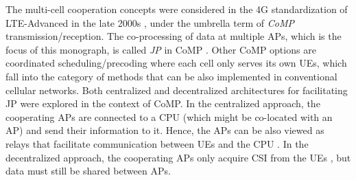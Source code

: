 The multi-cell cooperation concepts were considered in the 4G standardization of LTE-Advanced in the late 2000s \cite{Parkvall2008a}, under the umbrella term of \emph{\gls{CoMP}} transmission/reception. 
The co-processing of data at multiple \glspl{AP}, which is the focus of this monograph, is called \emph{\gls{JP}} in \gls{CoMP} \cite{Boldi2011a}. Other \gls{CoMP} options are coordinated scheduling/precoding where each cell only serves its own \glspl{UE}, which fall into the category of methods that can be also implemented in conventional cellular networks. Both centralized and decentralized architectures for facilitating \gls{JP} were explored in the context of \gls{CoMP}. In the centralized approach, the cooperating \glspl{AP} are connected to a \gls{CPU} (which might be co-located with an \gls{AP}) and send their information to it. Hence, the \glspl{AP} can be also viewed as relays that facilitate communication between \glspl{UE} and the \gls{CPU} \cite{Estella2019a}.
In the decentralized approach, the cooperating \glspl{AP} only acquire \gls{CSI} from the \glspl{UE} \cite{Papadogiannis2009a}, but data must still be shared between \glspl{AP}.


